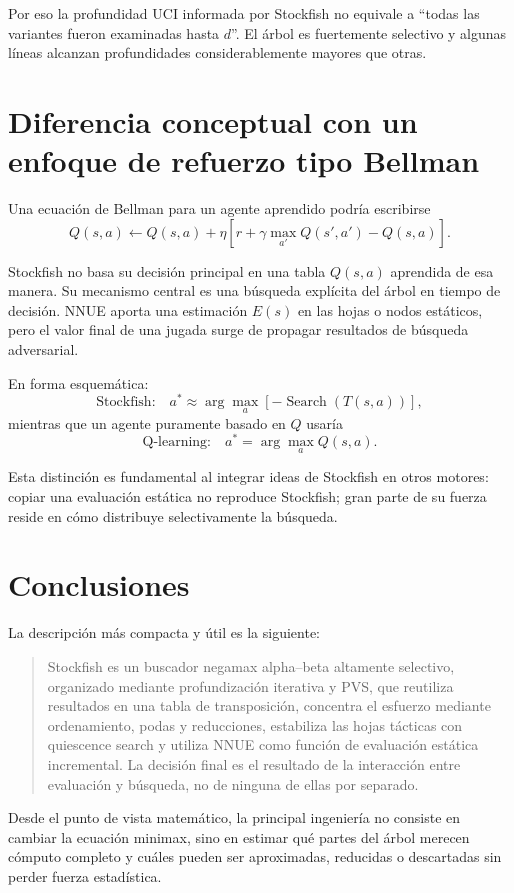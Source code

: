 \documentclass[11pt,a4paper]{article}
\begin{document}
Por eso la profundidad UCI informada por Stockfish no equivale a ``todas las variantes fueron examinadas hasta $d$''. El árbol es fuertemente selectivo y algunas líneas alcanzan profundidades considerablemente mayores que otras.

\section{Diferencia conceptual con un enfoque de refuerzo tipo Bellman}

Una ecuación de Bellman para un agente aprendido podría escribirse
\[
Q(s,a) \leftarrow Q(s,a)+\eta\left[r+\gamma\max_{a'}Q(s',a')-Q(s,a)\right].
\]

Stockfish no basa su decisión principal en una tabla $Q(s,a)$ aprendida de esa manera. Su mecanismo central es una búsqueda explícita del árbol en tiempo de decisión. NNUE aporta una estimación $E(s)$ en las hojas o nodos estáticos, pero el valor final de una jugada surge de propagar resultados de búsqueda adversarial.

En forma esquemática:
\[
\text{Stockfish:}\quad a^*\approx \arg\max_a\left[-\operatorname{Search}(T(s,a))\right],
\]
mientras que un agente puramente basado en $Q$ usaría
\[
\text{Q-learning:}\quad a^*=\arg\max_a Q(s,a).
\]

Esta distinción es fundamental al integrar ideas de Stockfish en otros motores: copiar una evaluación estática no reproduce Stockfish; gran parte de su fuerza reside en cómo distribuye selectivamente la búsqueda.

\section{Conclusiones}

La descripción más compacta y útil es la siguiente:
\begin{quote}
Stockfish es un buscador negamax alpha--beta altamente selectivo, organizado mediante profundización iterativa y PVS, que reutiliza resultados en una tabla de transposición, concentra el esfuerzo mediante ordenamiento, podas y reducciones, estabiliza las hojas tácticas con quiescence search y utiliza NNUE como función de evaluación estática incremental. La decisión final es el resultado de la interacción entre evaluación y búsqueda, no de ninguna de ellas por separado.
\end{quote}

Desde el punto de vista matemático, la principal ingeniería no consiste en cambiar la ecuación minimax, sino en estimar qué partes del árbol merecen cómputo completo y cuáles pueden ser aproximadas, reducidas o descartadas sin perder fuerza estadística.
\end{document}
